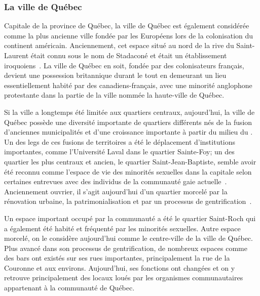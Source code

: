 \subsubsection{La ville de Québec}
Capitale de la province de Québec, la ville de Québec est également considérée comme la plus ancienne ville fondée par les Européens lors de la colonisation du continent américain. 
Anciennement, cet espace situé au nord de la rive du Saint-Laurent était connu sous le nom de Stadaconé et était un établissement iroquoiens~\citep[91]{Dickason1996}. 
La ville de Québec en soit, fondée par des colonisateurs français, devient une possession britannique durant le  tout en demeurant un lieu essentiellement habité par des canadiens-français, avec une minorité anglophone protestante dans la partie de la ville nommée la haute-ville de Québec\missref{}.

Si la ville a longtemps été limitée aux quartiers centraux, aujourd'hui, la ville de Québec possède une diversité importante de quartiers différents nés de la fusion d'anciennes municipalités et d'une croissance importante à partir du milieu du . 
Un des legs de ces fusions de territoires a été le déplacement d'institutions importantes, comme l'Université Laval dans le quartier Sainte-Foy; un des quartier les plus centraux et ancien, le quartier Saint-Jean-Baptiste, semble avoir été reconnu comme l'espace de vie des minorités sexuelles dans la capitale selon certaines entrevues avec des individus de la communauté gaie actuelle~\citep{CSJB2011}. 
Anciennement ouvrier, il s'agit aujourd'hui d'un quartier morcelé par la rénovation urbaine, la patrimonialisation et par un processus de gentrification~\citep{Hatvany2005,Mercier2014}.

Un espace important occupé par la communauté \lgbt{} a été le quartier Saint-Roch qui a également été habité et fréquenté par les minorités sexuelles.
Autre espace morcelé, on le considère aujourd'hui comme le centre-ville de la ville de Québec. 
Plus avancé dans son processus de gentrification, de nombreux espaces \lgbt{} comme des bars ont existés sur ses rues importantes, principalement la rue de la Couronne et aux environs. 
Aujourd'hui, ses fonctions ont changées et on y retrouve principalement des locaux loués par les organismes communautaires appartenant à la communauté \lgbt{} de Québec.

